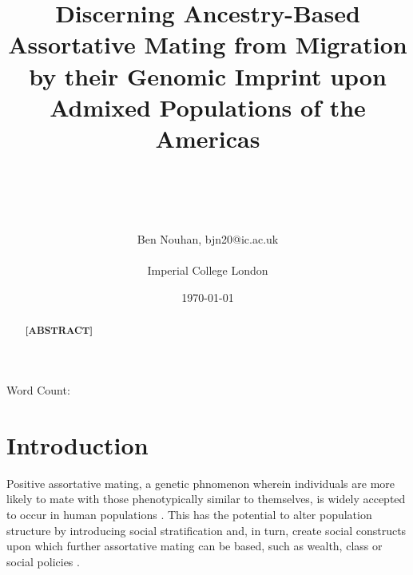 \documentclass[11pt]{article}
\title{Discerning Ancestry-Based Assortative Mating from Migration by their Genomic Imprint upon Admixed Populations of the Americas}
\author{\\ \\ \\ \\ Ben Nouhan, bjn20@ic.ac.uk \\ \\ Imperial College London \\}
\date{\today}
\newcommand\wordcount{}
\begin{document}
\vspace{30mm}
\maketitle
\thispagestyle{empty}

\vspace{5mm}
\centerline{Word Count: \wordcount}

\vspace{15mm}
\onehalfspacing
\renewcommand{\abstractname}{\vspace{-\baselineskip}} %

\begin{abstract}
    \linenumbers
    \noindent
    \textbf{
        [ABSTRACT]
    }
\end{abstract}
\vspace{10mm}


\newpage
\tableofcontents
\thispagestyle{empty}

\newpage
\linenumbers


\setcounter{page}{1}
\section{Introduction}





Positive assortative mating, a genetic phnomenon wherein individuals are more likely to mate with those phenotypically similar to themselves, is widely accepted to occur in human populations \parencite{Norris2019}. This has the potential to alter population structure by introducing social stratification and, in turn, create social constructs upon which further assortative mating can be based, such as wealth, class or social policies \parencite{Risch2009}.
\end{document}
